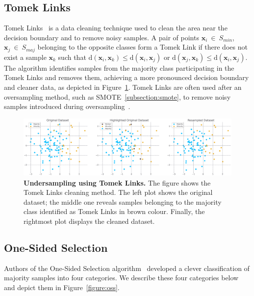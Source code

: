\subsection{Tomek Links}
\label{subsection:tomek-links}

Tomek Links~\cite{tomek-links} is a data cleaning technique used to clean the area near the
decision boundary and to remove noisy samples. A pair of points $\mathbf{x}_i~\in~S_{min}$,
$\mathbf{x}_j~\in~S_{maj}$ belonging to the opposite classes form a Tomek Link if there does not
exist a sample $\mathbf{x}_k$ such that $\mathrm{d}(\mathbf{x}_i, \mathbf{x}_k) \leq
\mathrm{d}(\mathbf{x}_i, \mathbf{x}_j)$ or $\mathrm{d}(\mathbf{x}_j, \mathbf{x}_k) \leq
\mathrm{d}(\mathbf{x}_i, \mathbf{x}_j)$. The algorithm identifies samples from the majority class
participating in the Tomek Links and removes them, achieving a more pronounced decision boundary
and cleaner data, as depicted in Figure~\ref{figure:tomek-links}. Tomek Links are often used after
an oversampling method, such as SMOTE~\ref{subsection:smote}, to remove noisy samples introduced
during oversampling~\cite{learning-from-imb-data, batista2004}.

\begin{figure}
    \centering
    \includegraphics[width=\linewidth]{figures/tomek_links.eps}
    \caption{
        \textbf{Undersampling using Tomek Links.} The figure shows the Tomek Links cleaning method.
        The left plot shows the original dataset; the middle one reveals samples belonging to the
        majority class identified as Tomek Links in brown colour. Finally, the rightmost plot
        displays the cleaned dataset.
    }
    \label{figure:tomek-links}
\end{figure}


\subsection{One-Sided Selection}
\label{subsection:one-side-selection}

Authors of the One-Sided Selection algorithm~\cite{one-sided-selection} developed a clever
classification of majority samples into four categories. We describe these four categories below
and depict them in Figure~\ref{figure:oss}.

